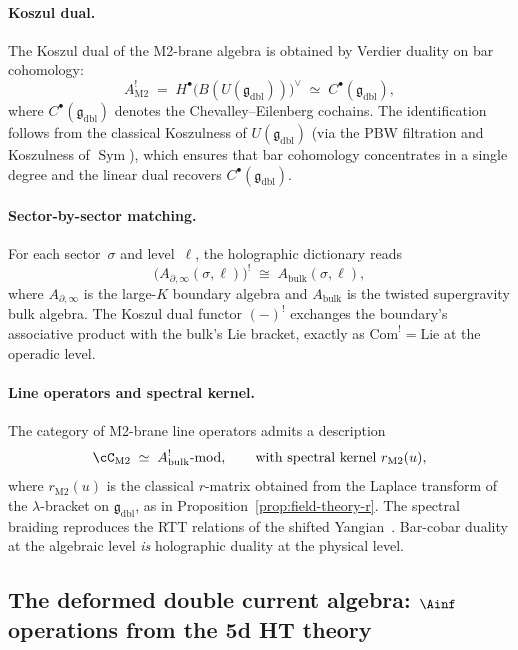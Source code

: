 \paragraph{Koszul dual.}
The Koszul dual of the M2-brane algebra is obtained by Verdier duality on bar cohomology:
\[
 A^!_{\mathrm{M2}}
 \;=\; H^\bullet\bigl(B(U(\mathfrak{g}_{\mathrm{dbl}}))\bigr)^{\vee}
 \;\simeq\; C^\bullet(\mathfrak{g}_{\mathrm{dbl}}),
\]
where $C^\bullet(\mathfrak{g}_{\mathrm{dbl}})$ denotes the Chevalley--Eilenberg
cochains. The identification follows from the classical Koszulness of
$U(\mathfrak{g}_{\mathrm{dbl}})$ (via the PBW filtration and Koszulness of
$\operatorname{Sym}$), which ensures that bar cohomology concentrates in a single
degree and the linear dual recovers $C^\bullet(\mathfrak{g}_{\mathrm{dbl}})$.

\paragraph{Sector-by-sector matching.}
For each sector~$\sigma$ and level~$\ell$, the holographic dictionary reads
\[
 \bigl(A_{\partial,\infty}(\sigma,\ell)\bigr)^!
 \;\cong\;
 A_{\mathrm{bulk}}(\sigma,\ell),
\]
where $A_{\partial,\infty}$ is the large-$K$ boundary algebra and
$A_{\mathrm{bulk}}$ is the twisted supergravity bulk algebra.
The Koszul dual functor $(-)^!$ exchanges the boundary's associative
product with the bulk's Lie bracket, exactly as $\mathrm{Com}^!=\mathrm{Lie}$
at the operadic level.

\paragraph{Line operators and spectral kernel.}
The category of M2-brane line operators admits a description
\[
 \cC_{\mathrm{M2}}
 \;\simeq\;
 A^!_{\mathrm{bulk}}\text{-}\mathrm{mod},
 \qquad
 \text{with spectral kernel } r_{\mathrm{M2}}(u),
\]
where $r_{\mathrm{M2}}(u)$ is the classical $r$-matrix obtained from the
Laplace transform of the $\lambda$-bracket on $\mathfrak{g}_{\mathrm{dbl}}$,
as in Proposition~\ref{prop:field-theory-r}. The spectral braiding
reproduces the RTT relations of the shifted Yangian~\cite{DNP2025}.
Bar-cobar duality at the algebraic level
\emph{is} holographic duality at the physical level.

\subsection{The deformed double current algebra: \texorpdfstring{$\Ainf$}{A-infinity}
 operations from the 5d HT theory}
\label{subsec:DDCA-ainfty}

